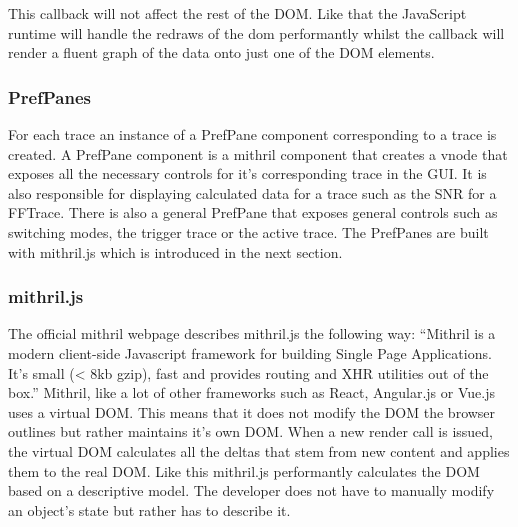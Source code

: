 
This callback will not affect the rest of the DOM. Like that the JavaScript runtime will handle the redraws of the dom performantly whilst the callback will render a fluent graph of the data onto just one of the DOM elements.

\subsubsection{PrefPanes}

For each trace an instance of a PrefPane component corresponding to a trace is created. A PrefPane component is a mithril component that creates a vnode that exposes all the necessary controls for it's corresponding trace in the GUI.
It is also responsible for displaying calculated data for a trace such as the SNR for a FFTrace.
There is also a general PrefPane that exposes general controls such as switching modes, the trigger trace or the active trace.
The PrefPanes are built with mithril.js which is introduced in the next section.

\subsubsection{mithril.js}
\label{subsec:gui:mithril}

The official mithril webpage describes mithril.js the following way: ``Mithril is a modern client-side Javascript framework for building Single Page Applications. It's small (< 8kb gzip), fast and provides routing and XHR utilities out of the box.\cite{mithril:home}'' Mithril, like a lot of other frameworks such as React, Angular.js or Vue.js uses a virtual DOM. This means that it does not modify the DOM the browser outlines but rather maintains it's own DOM. When a new render call is issued, the virtual DOM calculates all the deltas that stem from new content and applies them to the real DOM. Like this mithril.js performantly calculates the DOM based on a descriptive model. The developer does not have to manually modify an object's state but rather has to describe it.

